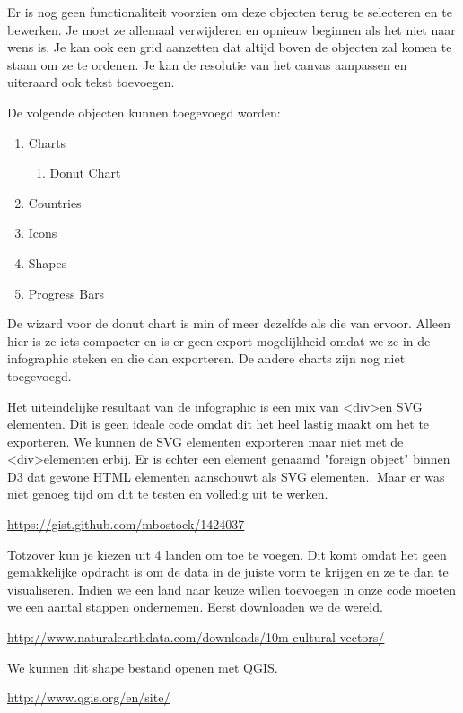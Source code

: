 Er is nog geen functionaliteit voorzien om deze objecten terug te selecteren en te bewerken. Je moet ze allemaal verwijderen en opnieuw beginnen als het niet naar wens is. Je kan ook een grid aanzetten dat altijd boven de objecten zal komen te staan om ze te ordenen. Je kan de resolutie van het canvas aanpassen en uiteraard ook tekst toevoegen.

De volgende objecten kunnen toegevoegd worden:

\begin{enumerate}
  \item Charts 
  		\begin{enumerate}
  			\item Donut Chart
  		\end{enumerate}
  \item Countries
  \item Icons
  \item Shapes
  \item Progress Bars
\end{enumerate}

De wizard voor de donut chart is min of meer dezelfde als die van ervoor. Alleen hier is ze iets compacter en is er geen export mogelijkheid omdat we ze in de infographic steken en die dan exporteren. De andere charts zijn nog niet toegevoegd.

Het uiteindelijke resultaat van de infographic is een mix van \textless div\textgreater en SVG elementen. Dit is geen ideale code omdat dit het heel lastig maakt om het te exporteren. We kunnen de SVG elementen exporteren maar niet met de \textless div\textgreater elementen erbij. Er is echter een element genaamd "foreign object"  binnen D3 dat gewone HTML elementen aanschouwt als SVG elementen.. Maar er was niet genoeg tijd om dit te testen en volledig uit te werken.

\url{https://gist.github.com/mbostock/1424037}

Totzover kun je kiezen uit 4 landen om toe te voegen. Dit komt omdat het geen gemakkelijke opdracht is om de data in de juiste vorm te krijgen en ze te dan te visualiseren. Indien we een land naar keuze willen toevoegen in onze code moeten we een aantal stappen ondernemen. 
Eerst downloaden we de wereld.

\url{http://www.naturalearthdata.com/downloads/10m-cultural-vectors/}

We kunnen dit shape bestand openen met QGIS.

\url{http://www.qgis.org/en/site/}


